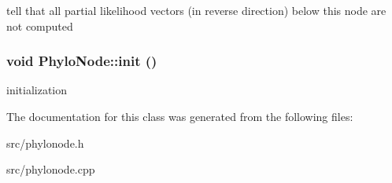 \label{classPhyloNode_ad752a7a4155b10d7b46d1f92afa9acc5}
tell that all partial likelihood vectors (in reverse direction) below this node are not computed \hypertarget{classPhyloNode_abb09e14a95714aa6d590c893700be656}{
\subsubsection[{init}]{\setlength{\rightskip}{0pt plus 5cm}void PhyloNode::init ()}}
\label{classPhyloNode_abb09e14a95714aa6d590c893700be656}
initialization 

The documentation for this class was generated from the following files:\begin{DoxyCompactItemize}
\item 
src/phylonode.h\item 
src/phylonode.cpp\end{DoxyCompactItemize}
